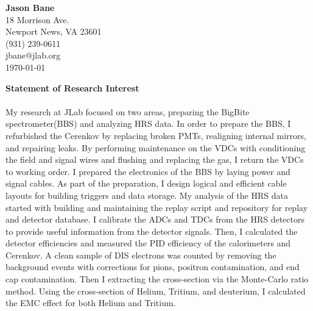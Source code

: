 \documentclass[12pt,letterpaper]{article}
\begin{document}
\vspace*{-1.2cm}
{\textbf{Jason Bane}}\\
18 Morrison Ave. \\
Newport News, VA 23601 \\
(931) 239-0611 \\
jbane@jlab.org \\
\today\\

{ \centering \textbf{Statement of Research Interest} \par}

\paragraph{}
My research at JLab focused on two areas, preparing the BigBite spectrometer(BBS) and analyzing HRS data. In order to prepare the BBS, I refurbished the Cerenkov by replacing broken PMTs, realigning internal mirrors, and repairing leaks. By performing maintenance on the VDCs with conditioning the field and signal wires and flushing and replacing the gas, I return the VDCs to working order. I prepared the electronics of the BBS by laying power and signal cables. As part of the preparation, I design logical and efficient cable layouts for building triggers and data storage. My analysis of the HRS data started with building and maintaining the replay script and repository for replay and detector database. I calibrate the ADCs and TDCs from the HRS detectors to provide useful information from the detector signals. Then, I calculated the detector efficiencies and measured the PID efficiency of the calorimeters and Cerenkov. A clean sample of DIS electrons was counted by removing the background events with corrections for pions, positron contamination, and end cap contamination. Then I extracting the cross-section via the Monte-Carlo ratio method. Using the cross-section of Helium, Tritium, and deuterium, I calculated the EMC effect for both Helium and Tritium. 
\end{document}
